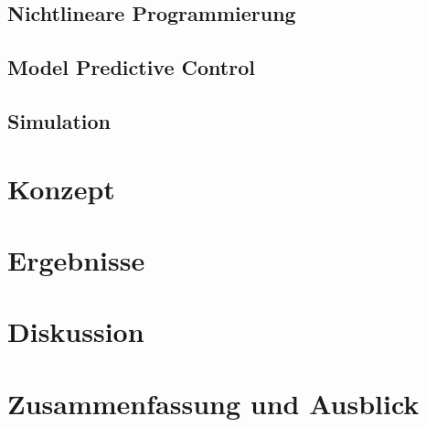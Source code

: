 \documentclass{like}
\begin{document}
\section{Nichtlineare Programmierung}

\section{Model Predictive Control}
\section{Simulation}





\chapter{Konzept}



\chapter{Ergebnisse}




\chapter{Diskussion}

\chapter[Zusammenfassung]{Zusammenfassung und Ausblick}


\appendix





%



%


\end{document}
